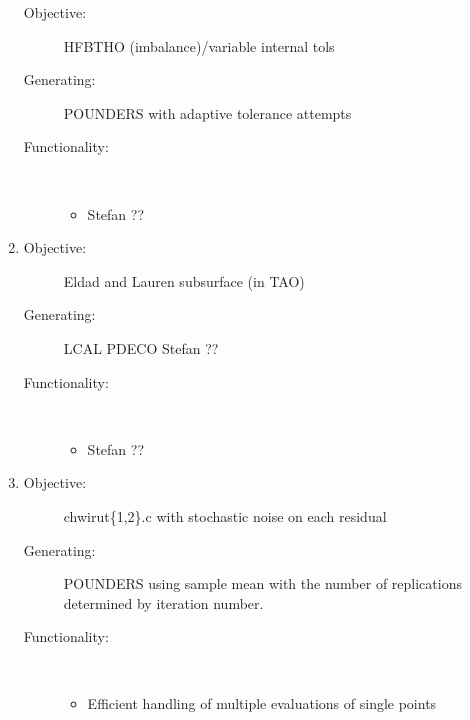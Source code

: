 \documentclass{article}
\begin{document}
\begin{enumerate}
\begin{description}
      \item[Objective:] HFBTHO (imbalance)/variable internal tols
      \item[Generating:] POUNDERS with adaptive tolerance attempts
      \item[Functionality:] \
        \begin{itemize}
          \item Stefan ??
        \end{itemize}
    \end{description}
    \bigskip
  \item 
    \begin{description}
      \item[Objective:] Eldad and Lauren subsurface (in TAO) 
      \item[Generating:] LCAL PDECO Stefan ??
      \item[Functionality:] \
        \begin{itemize}
          \item Stefan ??
        \end{itemize}
    \end{description}
    \bigskip
  \item 
    \begin{description}
      \item[Objective:] chwirut\{1,2\}.c with stochastic noise on each residual
      \item[Generating:] POUNDERS using sample mean with the number of replications determined by iteration number. 
      \item[Functionality:] \
        \begin{itemize}
          \item Efficient handling of multiple evaluations of single points
        \end{itemize}
    \end{description}
\end{enumerate}

\cite{nlopt}



\end{document}
